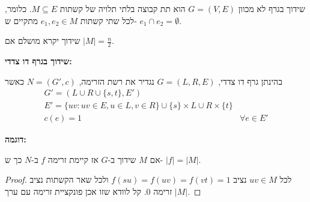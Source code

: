 שידוך בגרף לא מכוון
$G = (V, E)$
הוא תת קבוצה בלתי תלויה של קשתות 
$M \subseteq E$.
כלומר, לכל שתי קשתות 
$e_1, e_2 \in M$
מתקיים ש-%
$e_1 \cap e_2 = \emptyset$.

\begin{definition}
שידוך יקרא מושלם אם 
$|M| = \frac{n}{2}$.
\end{definition}

\textbf{שידוך בגרף דו צדדי:}

בהינתן גרף דו צדדי,
$G = (L, R, E)$
נגדיר את רשת הזרימה,
$N = (G', c)$
כאשר
$$
\begin{array}{ll}
G' = (L \cup R \cup \{s, t\}, E')
\\
E' = \{uv : uv \in E, u \in L, v \in R\} \cup \{s\} \times L \cup R \times \{t\}
\\
c(e) = 1 & \forall e \in E'
\end{array}
$$

\textbf{דוגמה:}

\begin{center}
\end{center}


\begin{claim}
אם $M$ שידוך ב-$G$ אז קיימת זרימה $f$ ב-$N$ כך ש-%
$|f| = |M|$.

\begin{proof}
לכל 
$uv \in M$
נציב
$f(su) = f(uv) = f(vt) = 1$
ולכל שאר הקשתות נציב זרימה 0.
קל לוודא שזו אכן פונקציית זרימה עם ערך 
$|M|$.
\end{proof}
\end{claim}

